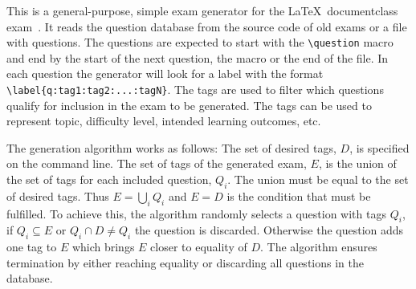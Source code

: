 This is a general-purpose, simple exam generator for the \LaTeX\ documentclass 
exam~\cite{exam}.
It reads the question database from the source code of old exams or a file with 
questions.
The questions are expected to start with the \verb'\question' macro and end by 
the start of the next question, the \verb'' macro or the end of 
the file.
In each question the generator will look for a label with the format 
\verb'\label{q:tag1:tag2:...:tagN}'.
The tags are used to filter which questions qualify for inclusion in the exam 
to be generated.
The tags can be used to represent topic, difficulty level, intended learning 
outcomes, etc.

The generation algorithm works as follows:
The set of desired tags, \(D\), is specified on the command line.
The set of tags of the generated exam, \(E\), is the union of the set of tags 
for each included question, \(Q_i\).
The union must be equal to the set of desired tags.
Thus \(E = \bigcup_i Q_i\) and \(E = D\) is the condition that must be 
fulfilled.
To achieve this, the algorithm randomly selects a question with tags \(Q_i\), 
if \(Q_i\subseteq E\) or \(Q_i\cap D\neq Q_i\) the question is discarded.
Otherwise the question adds one tag to \(E\) which brings \(E\) closer to 
equality of \(D\).
The algorithm ensures termination by either reaching equality or discarding all
questions in the database.
